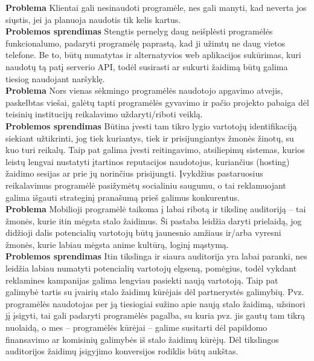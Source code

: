 \documentclass{VUMIFPSkursinis}
\begin{document}
		\noindent \textbf{Problema} Klientai gali nesinaudoti programėle, nes gali manyti, kad neverta jos siųstis, jei ja planuoja naudotis tik kelis kartus. \\
		\noindent \textbf{Problemos sprendimas} Stengtis pernelyg daug neišplėsti programėlės funkcionalumo, padaryti programėlę paprastą, kad ji užimtų ne daug vietos telefone. Be to, būtų numatytas ir alternatyvios web aplikacijos sukūrimas, kuri naudotų tą patį serverio API, todėl susirasti ar sukurti žaidimą būtų galima tiesiog naudojant naršyklę.\\
		
		\noindent \textbf{Problema} Nors vienas sėkmingo programėlės naudotojo apgavimo atvejis, paskelbtas viešai, galėtų tapti programėlės gyvavimo ir pačio projekto pabaiga dėl teisinių institucijų reikalavimo uždaryti/riboti veiklą.\\
		\noindent \textbf{Problemos sprendimas} Būtina įvesti tam tikro lygio vartotojų identifikaciją siekiant užtikrinti, jog tiek kuriantys, tiek ir prisijungiantys žmonės žinotų, su kuo turi reikalų. Taip pat galima įvesti reitingavimo, atsiliepimų sistemas, kurios leistų lengvai nustatyti įtartinos reputacijos naudotojus, kuriančius (hosting) žaidimo sesijas ar prie jų norinčius prisijungti. Įvykdžius pastaruosius reikalavimus programėlė pasižymėtų socialiniu saugumu, o tai reklamuojant galima išgauti strateginį pranašumą prieš galimus konkurentus.\\
		
		\noindent \textbf{Problema} Mobilioji programėlė taikoma į labai ribotą ir tikslinę auditoriją – tai žmonės, kurie itin mėgsta stalo žaidimus. Ši pastaba leidžia daryti prielaidą, jog didžioji dalis potencialių vartotojų būtų jaunesnio amžiaus ir/arba vyresni žmonės, kurie labiau mėgsta anime kultūrą, loginį mąstymą.\\
		\noindent \textbf{Problemos sprendimas} Itin tikslinga ir siaura auditorija yra labai paranki, nes leidžia labiau numatyti potencialių vartotojų elgseną, pomėgius, todėl vykdant reklamines kampanijas galima lengviau pasiekti naują vartotoją. Taip pat galimybė tartis su įvairių stalo žaidimų kūrėjais dėl partnerystės galimybių. Pvz. programėlės naudotojas per ją tiesiogiai sužino apie naują stalo žaidimą, užsinori jį įsigyti, tai gali padaryti programėlės pagalba, su kuria pvz. jis gautų tam tikrą nuolaidą, o mes – programėlės kūrėjai – galime susitarti dėl papildomo finansavimo ar komisinių galimybės iš stalo žaidimų kūrėjų. Dėl tikslingos auditorijos žaidimų įsigyjimo konversijos rodiklis būtų aukštas.\\
		
\end{document}
